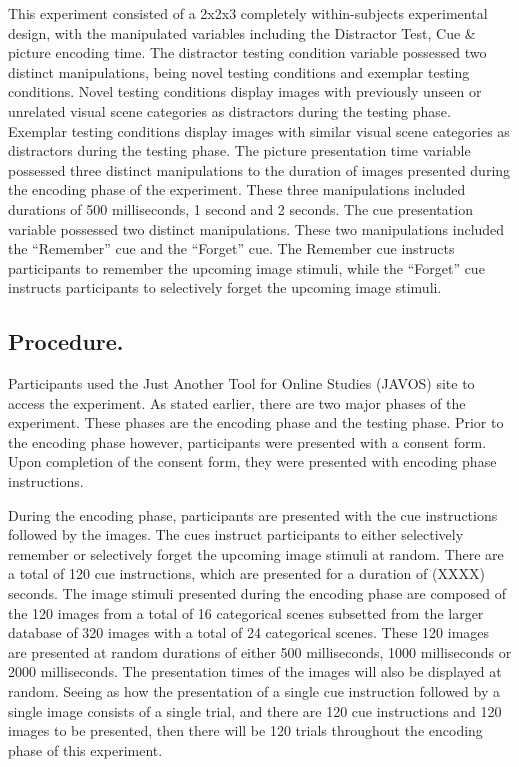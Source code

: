 \documentclass[
  english,
  man,floatsintext]{apa6}
\begin{document}
This experiment consisted of a 2x2x3 completely within-subjects experimental design, with the manipulated variables including the Distractor Test, Cue \& picture encoding time. The distractor testing condition variable possessed two distinct manipulations, being novel testing conditions and exemplar testing conditions. Novel testing conditions display images with previously unseen or unrelated visual scene categories as distractors during the testing phase. Exemplar testing conditions display images with similar visual scene categories as distractors during the testing phase. The picture presentation time variable possessed three distinct manipulations to the duration of images presented during the encoding phase of the experiment. These three manipulations included durations of 500 milliseconds, 1 second and 2 seconds. The cue presentation variable possessed two distinct manipulations. These two manipulations included the \enquote{Remember} cue and the \enquote{Forget} cue. The Remember cue instructs participants to remember the upcoming image stimuli, while the \enquote{Forget} cue instructs participants to selectively forget the upcoming image stimuli.

\hypertarget{procedure.}{%
\subsection{Procedure.}\label{procedure.}}

Participants used the Just Another Tool for Online Studies (JAVOS) site to access the experiment. As stated earlier, there are two major phases of the experiment. These phases are the encoding phase and the testing phase. Prior to the encoding phase however, participants were presented with a consent form. Upon completion of the consent form, they were presented with encoding phase instructions.

During the encoding phase, participants are presented with the cue instructions followed by the images. The cues instruct participants to either selectively remember or selectively forget the upcoming image stimuli at random. There are a total of 120 cue instructions, which are presented for a duration of (XXXX) seconds. The image stimuli presented during the encoding phase are composed of the 120 images from a total of 16 categorical scenes subsetted from the larger database of 320 images with a total of 24 categorical scenes. These 120 images are presented at random durations of either 500 milliseconds, 1000 milliseconds or 2000 milliseconds. The presentation times of the images will also be displayed at random. Seeing as how the presentation of a single cue instruction followed by a single image consists of a single trial, and there are 120 cue instructions and 120 images to be presented, then there will be 120 trials throughout the encoding phase of this experiment.
\end{document}
